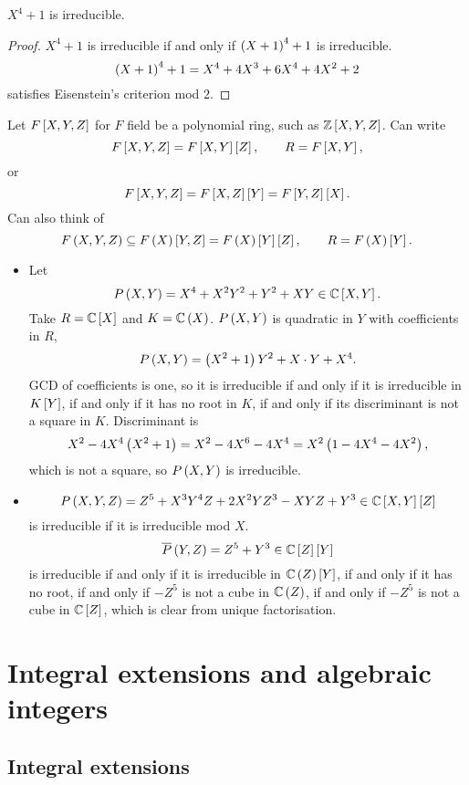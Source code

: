 \begin{corollary}
$ X^4 + 1 $ is irreducible.
\end{corollary}

\begin{proof}
$ X^4 + 1 $ is irreducible if and only if $ \rb{X + 1}^4 + 1 $ is irreducible.
$$ \rb{X + 1}^4 + 1 = X^4 + 4X^3 + 6X^4 + 4X^2 + 2 $$
satisfies Eisenstein's criterion mod $ 2 $.
\end{proof}


\begin{example*}
Let $ F\sb{X, Y, Z} $ for $ F $ field be a polynomial ring, such as $ \Z\sb{X, Y, Z} $. Can write
$$ F\sb{X, Y, Z} = F\sb{X, Y}\sb{Z}, \qquad R = F\sb{X, Y}, $$
or
$$ F\sb{X, Y, Z} = F\sb{X, Z}\sb{Y} = F\sb{Y, Z}\sb{X}. $$
Can also think of
$$ F\rb{X, Y, Z} \subseteq F\rb{X}\sb{Y, Z} = F\rb{X}\sb{Y}\sb{Z}, \qquad R = F\rb{X}\sb{Y}. $$
\begin{itemize}
\item Let
$$ P\rb{X, Y} = X^4 + X^2Y^2 + Y^2 + XY \in \C\sb{X, Y}. $$
Take $ R = \C\sb{X} $ and $ K = \C\rb{X} $. $ P\rb{X, Y} $ is quadratic in $ Y $ with coefficients in $ R $,
$$ P\rb{X, Y} = \rb{X^2 + 1}Y^2 + X \cdot Y + X^4. $$
GCD of coefficients is one, so it is irreducible if and only if it is irreducible in $ K\sb{Y} $, if and only if it has no root in $ K $, if and only if its discriminant is not a square in $ K $. Discriminant is
$$ X^2 - 4X^4\rb{X^2 + 1} = X^2 - 4X^6 - 4X^4 = X^2\rb{1 - 4X^4 - 4X^2}, $$
which is not a square, so $ P\rb{X, Y} $ is irreducible.
\item
$$ P\rb{X, Y, Z} = Z^5 + X^3Y^4Z + 2X^2YZ^3 - XYZ + Y^3 \in \C\sb{X, Y}\sb{Z} $$
is irreducible if it is irreducible mod $ X $.
$$ \overline{P}\rb{Y, Z} = Z^5 + Y^3 \in \C\sb{Z}\sb{Y} $$
is irreducible if and only if it is irreducible in $ \C\rb{Z}\sb{Y} $, if and only if it has no root, if and only if $ -Z^5 $ is not a cube in $ \C\rb{Z} $, if and only if $ -Z^5 $ is not a cube in $ \C\sb{Z} $, which is clear from unique factorisation.
\end{itemize}
\end{example*}

\pagebreak

\section{Integral extensions and algebraic integers}

\subsection{Integral extensions}

